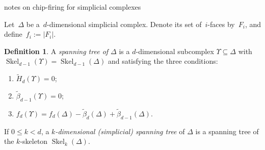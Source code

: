 \documentclass[12pt]{article}
\newcommand{\tH}{\widetilde{H}}
\newcommand{\tb}{\tilde{\beta}}
\DeclareMathOperator{\skel}{Skel}
\theoremstyle{definition}
\newtheorem{definition}[theorem]{Definition}
\theoremstyle{remark}
\begin{document}
\centerline{\sc notes on chip-firing for simplicial complexes}
\bigskip

Let~$\Delta$ be a~$d$-dimensional simplicial complex.  Denote its set
of~$i$-faces by~$F_i$, and define~$f_i:=|F_i|$.

\begin{definition}\label{def: spanning tree} 
  A {\em spanning tree of $\Delta$} is a $d$-dimensional subcomplex
  $\Upsilon\subseteq\Delta$ with $\skel_{d-1}(\Upsilon)=\skel_{d-1}(\Delta)$ and
  satisfying the three conditions:
  \begin{enumerate}[leftmargin=*]
    \item\label{sst1}  $\tH_d(\Upsilon)=0$;
    \item\label{sst2}  $\tb_{d-1}(\Upsilon)=0$;
    \item\label{sst3}  $f_d(\Upsilon) = f_d(\Delta)-\tb_d(\Delta)+\tb_{d-1}(\Delta)$.
  \end{enumerate}
  If $0\le k<d$, a \emph{$k$-dimensional (simplicial) spanning tree} of $\Delta$ is a spanning tree of
  the $k$-skeleton $\skel_{k}(\Delta)$.
  \end{definition}
\end{document}
